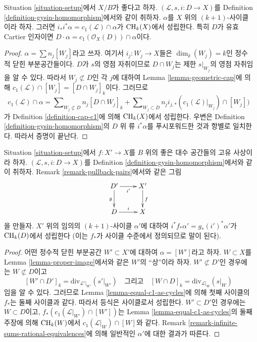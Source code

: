 \begin{lemma}
\label{lemma-support-cap-effective-Cartier}
Situation \ref{situation-setup}에서 $X/B$가 좋다고 하자.
$(\mathcal{L}, s, i : D \to X)$를 Definition
\ref{definition-gysin-homomorphism}에서와 같이 취하자.
$\alpha$를 $X$ 위의 $(k + 1)$-사이클이라 하자. 그러면
$i_*i^*\alpha = c_1(\mathcal{L}) \cap \alpha$가 $\mathop{\mathrm{CH}}\nolimits_k(X)$에서
성립한다. 특히 $D$가 유효 Cartier 인자이면
$D \cdot \alpha = c_1(\mathcal{O}_X(D)) \cap \alpha$이다.
\end{lemma}

\begin{proof}
$\alpha = \sum n_j[W_j]$라고 쓰자. 여기서
$i_j : W_j \to X$들은 $\dim_\delta(W_j) = k$인 정수적 닫힌
부분공간들이다. $D$가 $s$의 영점 자취이므로
$D \cap W_j$는 제한 $s|_{W_j}$의 영점 자취임을 알 수 있다.
따라서 $W_j \not \subset D$인 각 $j$에 대하여 Lemma
\ref{lemma-geometric-cap}에 의해
$c_1(\mathcal{L}) \cap [W_j] = [D \cap W_j]_k$이다. 그러므로
$$
c_1(\mathcal{L}) \cap \alpha
=
\sum\nolimits_{W_j \not \subset D} n_j[D \cap W_j]_k
+
\sum\nolimits_{W_j \subset D}
n_j i_{j, *}(c_1(\mathcal{L})|_{W_j}) \cap [W_j])
$$
가 Definition \ref{definition-cap-c1}에 의해 $\mathop{\mathrm{CH}}\nolimits_k(X)$에서
성립한다. 우변은 Definition \ref{definition-gysin-homomorphism}의
$D$ 위 류 $i^*\alpha$를 푸시포워드한 것과 항별로 일치한다.
따라서 증명이 끝난다.
\end{proof}

\begin{lemma}
\label{lemma-closed-in-X-gysin}
Situation \ref{situation-setup}에서 $f : X' \to X$를 $B$ 위의 좋은
대수 공간들의 고유 사상이라 하자.
$(\mathcal{L}, s, i : D \to X)$를 Definition
\ref{definition-gysin-homomorphism}에서와 같이 취하자. Remark
\ref{remark-pullback-pairs}에서와 같은 그림
$$
\xymatrix{
D' \ar[d]_g \ar[r]_{i'} & X' \ar[d]^f \\
D \ar[r]^i & X
}
$$
을 만들자. $X'$ 위의 임의의 $(k + 1)$-사이클 $\alpha'$에 대하여
$i^*f_*\alpha' = g_*(i')^*\alpha'$가 $\mathop{\mathrm{CH}}\nolimits_k(D)$에서 성립한다
(이는 $f_*$가 사이클 수준에서 정의되므로 말이 된다).
\end{lemma}

\begin{proof}
어떤 정수적 닫힌 부분공간 $W' \subset X'$에 대하여
$\alpha = [W']$라고 하자. $W \subset X$를 Lemma
\ref{lemma-proper-image}에서와 같은 $W'$의 “상”이라 하자.
$W' \not \subset D'$인 경우에는 $W \not \subset D$이고
$$
[W' \cap D']_k = \text{div}_{\mathcal{L}'|_{W'}}({s'|_{W'}})
\quad\text{그리고}\quad
[W \cap D]_k = \text{div}_{\mathcal{L}|_W}(s|_W)
$$
임을 알 수 있다. 그러므로 Lemma \ref{lemma-equal-c1-as-cycles}에
의해 첫째 사이클의 $f_*$는 둘째 사이클과 같다. 따라서 등식은
사이클로서 성립한다. $W' \subset D'$인 경우에는 $W \subset D$이고,
$f_*(c_1(\mathcal{L}|_{W'}) \cap [W'])$는 Lemma
\ref{lemma-equal-c1-as-cycles}의 둘째 주장에 의해 $\mathop{\mathrm{CH}}\nolimits_k(W)$에서
$c_1(\mathcal{L}|_W) \cap [W]$와 같다. Remark
\ref{remark-infinite-sums-rational-equivalences}에 의해 일반적인
$\alpha'$에 대한 결과가 따른다.
\end{proof}

